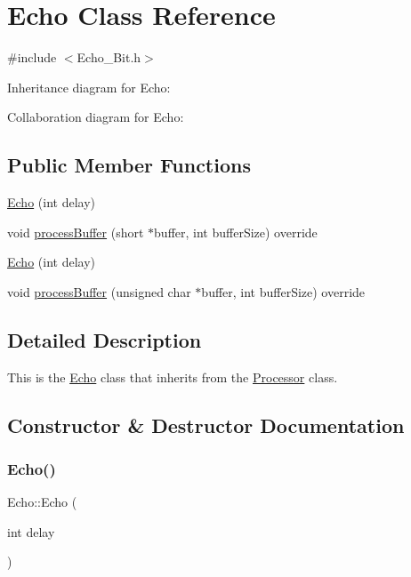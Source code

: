 \hypertarget{classEcho}{}\section{Echo Class Reference}
\label{classEcho}


{\ttfamily \#include $<$Echo\+\_\+Bit.\+h$>$}



Inheritance diagram for Echo\+:


Collaboration diagram for Echo\+:
\subsection*{Public Member Functions}
\begin{DoxyCompactItemize}
\item 
\hyperlink{classEcho_a9531515ffab8be1e38cbdc0e0e9338a6}{Echo} (int delay)
\item 
void \hyperlink{classEcho_a18d9d3ec6f9a225810dbe5965e988de9}{process\+Buffer} (short $\ast$buffer, int buffer\+Size) override
\item 
\hyperlink{classEcho_a9531515ffab8be1e38cbdc0e0e9338a6}{Echo} (int delay)
\item 
void \hyperlink{classEcho_ae915d9d4065a34411d18791a5ae9006b}{process\+Buffer} (unsigned char $\ast$buffer, int buffer\+Size) override
\end{DoxyCompactItemize}


\subsection{Detailed Description}
This is the \hyperlink{classEcho}{Echo} class that inherits from the \hyperlink{classProcessor}{Processor} class. 

\subsection{Constructor \& Destructor Documentation}
\mbox{\label{classEcho_a9531515ffab8be1e38cbdc0e0e9338a6}} 
\subsubsection{\texorpdfstring{Echo()}{Echo()}\hspace{0.1cm}{\footnotesize\ttfamily [1/2]}}
{\footnotesize\ttfamily Echo\+::\+Echo (\begin{DoxyParamCaption}\item[{int}]{delay }\end{DoxyParamCaption})\hspace{0.3cm}{\ttfamily [explicit]}}

